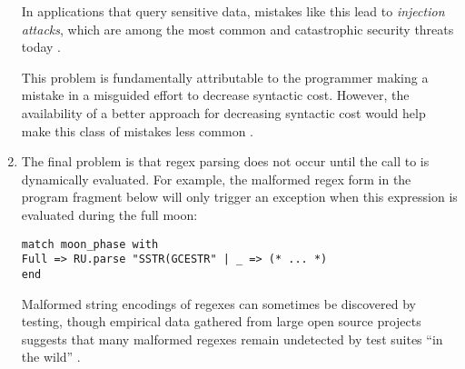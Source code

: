 \begin{enumerate}
In applications that query sensitive data, mistakes like this lead to \emph{injection attacks}, which are among the most common and catastrophic security threats today \cite{owasp2013}.

This problem is fundamentally attributable to the programmer making a mistake in a misguided effort to decrease syntactic cost. However, the availability of a better approach for decreasing syntactic cost would help make this class of mistakes less common \cite{Bravenboer:2007:PIA:1289971.1289975}. %



\item The final problem is that regex parsing does not occur until the call to  is dynamically evaluated. For example, the malformed regex form in the program fragment below will only trigger an exception when this expression is evaluated during the full moon: %

\begin{lstlisting}[numbers=none]
match moon_phase with 
Full => RU.parse "SSTR(GCESTR" | _ => (* ... *)
end
\end{lstlisting}
Malformed string encodings of regexes can sometimes be discovered by testing, though empirical data gathered from large open source projects suggests that  many malformed regexes remain undetected by test suites ``in the wild'' \cite{spishak2012type}.


\end{enumerate}
